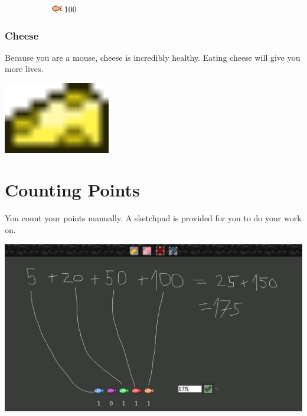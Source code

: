 \documentclass[12pt]{book}
\begin{document}
\begin{figure}[h]
					\hspace{1mm}
					\begin{subfigure}[t]{0.16\textwidth}
						\centering
						\includegraphics[width=\textwidth]{OrangeFish}
						100
					\end{subfigure}
				\end{figure}
			\subsection{Cheese}
				Because you are a mouse, cheese is incredibly healthy. Eating cheese will give you more lives.
				\begin{center}
					\includegraphics[width=0.35\textwidth]{Cheese}
				\end{center}
	\chapter{Counting Points}
		You count your points manually. A sketchpad is provided for you to do your work on.

		\includegraphics[width=\textwidth]{CountingScreen}
\end{document}
